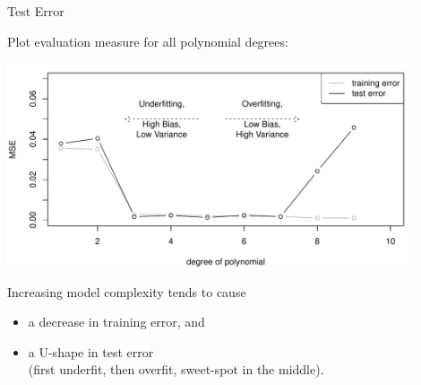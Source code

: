 \documentclass[11pt,compress,t,notes=noshow, xcolor=table]{beamer}
\newenvironment{knitrout}{}{} %
\begin{document}
% 
% 
% 
% 
% 
% 
% 

% 
% 
% 
% 
% 
% 
% 


\begin{vbframe}{Test Error}

Plot evaluation measure for all polynomial degrees:

\includegraphics[width=0.9\textwidth]{figure/eval_test_3} 

Increasing model complexity tends to cause

\begin{itemize}
  \item a decrease in training error, and\\
  \item a U-shape in test error\\ 
  (first underfit, then overfit, sweet-spot in the middle).
  \end{itemize}
  
\end{vbframe}
\end{document}
